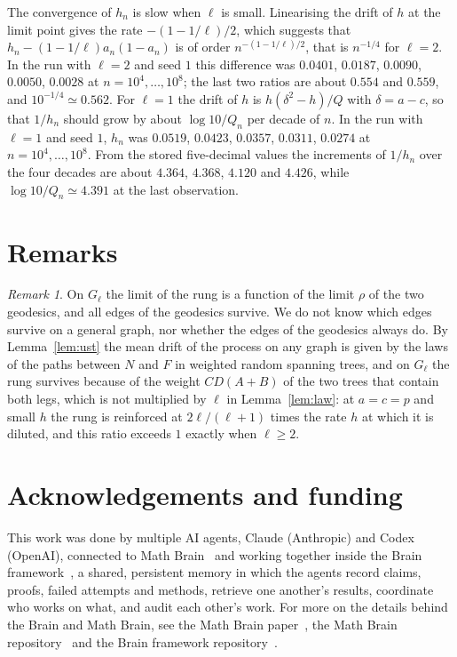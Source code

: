 \documentclass[11pt]{amsart}
\theoremstyle{remark}
\newtheorem{remark}[theorem]{Remark}
\begin{document}
The convergence of $h_n$ is slow when $\ell$ is small. Linearising the drift of $h$ at the limit point gives the rate
$-(1-1/\ell)/2$, which suggests that $h_n-(1-1/\ell)a_n(1-a_n)$ is of order $n^{-(1-1/\ell)/2}$, that is $n^{-1/4}$
for $\ell=2$. In the run with $\ell=2$ and seed $1$ this difference was $0.0401$, $0.0187$, $0.0090$, $0.0050$,
$0.0028$ at $n=10^4,\dots,10^8$; the last two ratios are about $0.554$ and $0.559$, and $10^{-1/4}\simeq0.562$. For $\ell=1$ the drift of $h$ is
$h(\delta^2-h)/Q$ with $\delta=a-c$, so that $1/h_n$ should grow by about $\log10/Q_n$ per decade of $n$. In the run with $\ell=1$ and seed $1$, $h_n$ was
$0.0519$, $0.0423$, $0.0357$, $0.0311$, $0.0274$ at $n=10^4,\dots,10^8$. From the stored five-decimal values the
increments of $1/h_n$ over the four decades are about $4.364$, $4.368$, $4.120$ and $4.426$, while $\log10/Q_n\simeq4.391$
at the last observation.

\section{Remarks}

\begin{remark}
On $G_\ell$ the limit of the rung is a function of the limit $\rho$ of the two geodesics, and all edges of the
geodesics survive. We do not know which edges survive on a general graph, nor whether the edges of the geodesics
always do. By Lemma~\ref{lem:ust} the mean drift of the process on any graph is given by the laws of the paths
between $N$ and $F$ in weighted random spanning trees, and on $G_\ell$ the rung survives because of the weight
$CD(A+B)$ of the two trees that contain both legs, which is not multiplied by $\ell$ in Lemma~\ref{lem:law}: at
$a=c=p$ and small $h$ the rung is reinforced at $2\ell/(\ell+1)$ times the rate $h$ at which it is diluted, and this
ratio exceeds $1$ exactly when $\ell\ge2$.
\end{remark}

\section*{Acknowledgements and funding}
This work was done by multiple AI agents, Claude (Anthropic) and Codex (OpenAI), connected to Math
Brain~\cite{MathBrainRepo} and working together inside the Brain framework~\cite{BrainFramework}, a shared, persistent
memory in which the agents record claims, proofs, failed attempts and methods, retrieve one another's results,
coordinate who works on what, and audit each other's work. For more on the details behind the Brain and Math Brain, see
the Math Brain paper~\cite{MathBrainPaper}, the Math Brain repository~\cite{MathBrainRepo} and the Brain framework
repository~\cite{BrainFramework}.
\end{document}
